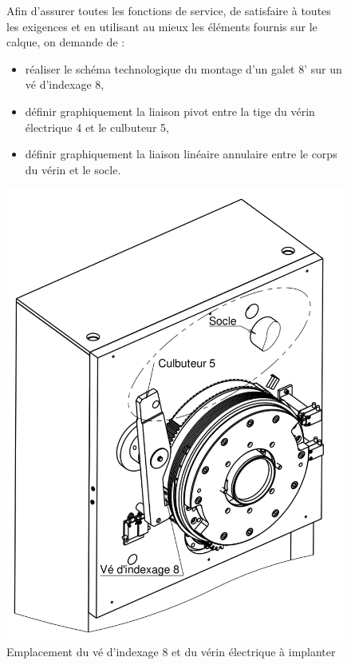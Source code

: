 \begin{figure}[ht!]
\begin{minipage}{0.55\linewidth}
Afin d’assurer toutes les fonctions de service, de satisfaire à toutes les exigences et en utilisant au mieux les éléments fournis sur le calque, on demande de :
\begin{itemize}
 \item réaliser le schéma technologique du montage d’un galet 8’ sur un vé d’indexage 8,
 \item définir graphiquement la liaison pivot entre la tige du vérin électrique 4 et le culbuteur 5,
 \item définir graphiquement la liaison linéaire annulaire entre le corps du vérin et le socle.
\end{itemize}
\end{minipage}\hfill
\begin{minipage}{0.42\linewidth}
\centering\includegraphics[width=0.95\linewidth]{img/fig10}
 \caption{Emplacement du vé d’indexage 8 et du vérin électrique à implanter}
 \label{img10}
\end{minipage}
\end{figure}

